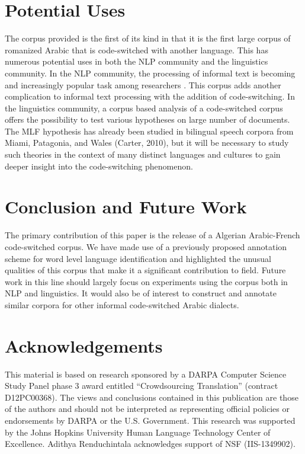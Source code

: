 \documentclass[10pt, a4paper]{article}
\begin{document}
\section{Potential Uses}
The corpus provided is the first of its kind in that it is the first
large corpus of romanized Arabic that is code-switched with another
language. This has numerous potential uses in both the NLP community
and the linguistics community. In the NLP community, the processing of
informal text is becoming and increasingly popular task among
researchers \cite{yang2013log}. This corpus adds another complication
to informal text processing with the addition of code-switching. In
the linguistics community, a corpus based analysis of a code-switched
corpus offers the possibility to test various hypotheses on large
number of documents. The MLF hypothesis has already been studied in
bilingual speech corpora from Miami, Patagonia, and Wales (Carter,
2010), but it will be necessary to study such theories in the context
of many distinct languages and cultures to gain deeper insight into
the code-switching phenomenon.


\section{Conclusion and Future Work}
The primary contribution of this paper is the release of a Algerian
Arabic-French code-switched corpus. We have made use of a previously
proposed annotation scheme for word level language identification and
highlighted the unusual qualities of this corpus that make it a
significant contribution to field. Future work in this line should
largely focus on experiments using the corpus both in NLP and
linguistics. It would also be of interest to construct and annotate
similar corpora for other informal code-switched Arabic dialects.


\section*{Acknowledgements}
This material is based on research sponsored by a DARPA Computer Science Study Panel phase 3 award entitled ``Crowdsourcing Translation'' (contract D12PC00368). The views and conclusions contained in this publication are those of the authors and should not be interpreted as representing official policies or endorsements by DARPA or the U.S. Government. This research was supported by the Johns Hopkins University Human Language Technology Center of Excellence. Adithya Renduchintala acknowledges support of NSF (IIS-1349902).





\end{document}
